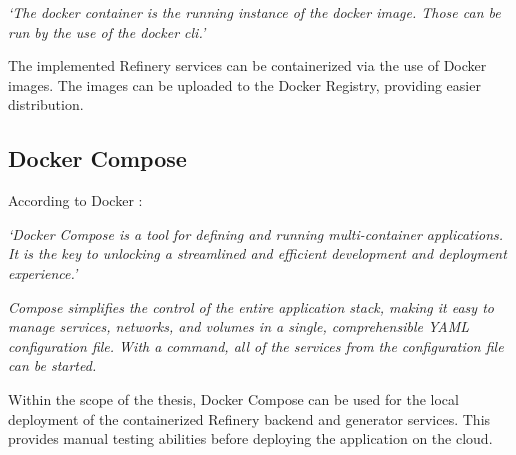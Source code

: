 		\textit{
			`The docker container is the running instance of the docker image. Those can be run by the use of the docker cli.'
		}

		The implemented Refinery services can be containerized via the use of Docker images. The images can be uploaded to the 
		Docker Registry, providing easier distribution.


	\subsection{Docker Compose} \label{backgdockercompose}
		According to Docker \cite{dockercompose}:

		\textit{
			`Docker Compose \cite{dockercompose} is a tool for defining and running multi-container applications. 
			It is the key to unlocking a streamlined and efficient development and deployment experience.'
		}

		\textit{
			Compose simplifies the control of the entire application stack, making it easy to manage services, 
			networks, and volumes in a single, comprehensible YAML configuration file. 
			With a command, all of the services from the configuration file can be started.
		}

		Within the scope of the thesis, Docker Compose can be used for the local deployment of 
		the containerized Refinery backend and generator services. This provides manual testing abilities
		before deploying the application on the cloud.

